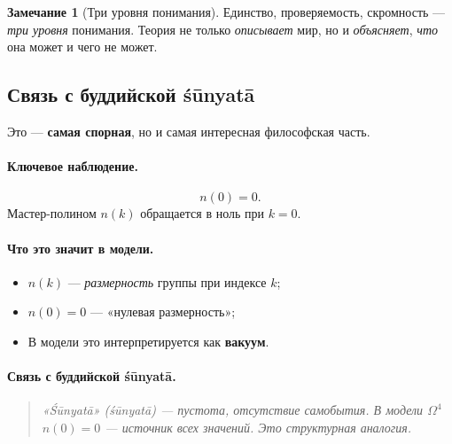 \documentclass[11pt,a4paper]{article}
\newcommand{\Om}{\Omega^4}
\theoremstyle{definition}
\newtheorem{remark}[theorem]{Замечание}
\begin{document}
\begin{remark}[Три уровня понимания]
\label{rem:three-understanding}
Единство, проверяемость, скромность — \emph{три уровня} 
понимания. Теория не только \emph{описывает} мир, но и 
\emph{объясняет}, \emph{что} она может и чего не может.
\end{remark}

\subsection{Связь с буддийской śūnyatā}
\label{subsec:shunyata}

Это — \textbf{самая спорная}, но и самая интересная 
философская часть.

\paragraph{Ключевое наблюдение.}
\begin{equation}
    \boxed{
    n(0) = 0.
    }
    \label{eq:n-zero}
\end{equation}
Мастер-полином $n(k)$ обращается в ноль при $k = 0$.

\paragraph{Что это значит в модели.}
\begin{itemize}
    \item $n(k)$ — \emph{размерность} группы при индексе $k$;
    \item $n(0) = 0$ — «нулевая размерность»;
    \item В модели это интерпретируется как \textbf{вакуум}.
\end{itemize}

\paragraph{Связь с буддийской śūnyatā.}
\begin{quote}
\itshape
«Śūnyatā» (śūnyatā) — пустота, отсутствие самобытия. 
В модели $\Om$ $n(0) = 0$ — \emph{источник} всех значений. 
Это \emph{структурная} аналогия.
\end{quote}
\end{document}
